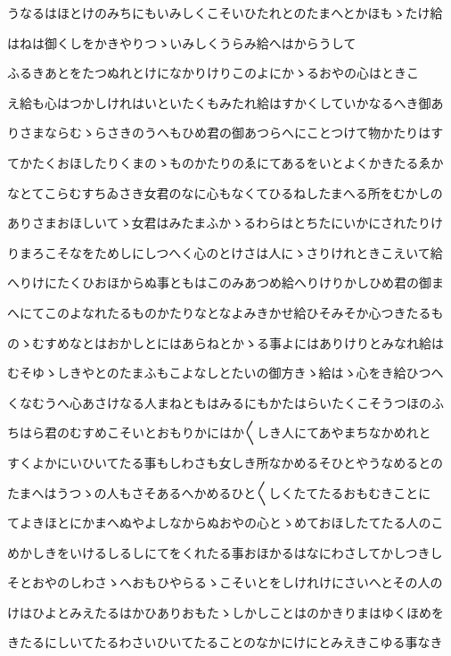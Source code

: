 \documentclass[a4paper,11pt,landscape]{ltjtarticle}
\begin{document}
うなるはほとけのみちにもいみしくこそいひたれとのたまへとかほもゝたけ給
\par\medskip
はねは御くしをかきやりつゝいみしくうらみ給へはからうして
\par\medskip
ふるきあとをたつぬれとけになかりけりこのよにかゝるおやの心はときこ
\par\medskip
え給も心はつかしけれはいといたくもみたれ給はすかくしていかなるへき御あ
\par\medskip
りさまならむゝらさきのうへもひめ君の御あつらへにことつけて物かたりはす
\par\medskip
てかたくおほしたりくまのゝものかたりのゑにてあるをいとよくかきたるゑか
\par\medskip
なとてこらむすちゐさき女君のなに心もなくてひるねしたまへる所をむかしの
\par\medskip
ありさまおほしいてゝ女君はみたまふかゝるわらはとちたにいかにされたりけ
\par\medskip
りまろこそなをためしにしつへく心のとけさは人にゝさりけれときこえいて給
\par\medskip
へりけにたくひおほからぬ事ともはこのみあつめ給へりけりかしひめ君の御ま
\par\medskip
へにてこのよなれたるものかたりなとなよみきかせ給ひそみそか心つきたるも
\par\medskip
のゝむすめなとはおかしとにはあらねとかゝる事よにはありけりとみなれ給は
\par\medskip
むそゆゝしきやとのたまふもこよなしとたいの御方きゝ給はゝ心をき給ひつへ
\par\medskip
くなむうへ心あさけなる人まねともはみるにもかたはらいたくこそうつほのふ
\par\medskip
ちはら君のむすめこそいとおもりかにはか〱しき人にてあやまちなかめれと
\par\medskip
すくよかにいひいてたる事もしわさも女しき所なかめるそひとやうなめるとの
\par\medskip
たまへはうつゝの人もさそあるへかめるひと〱しくたてたるおもむきことに
\par\medskip
てよきほとにかまへぬやよしなからぬおやの心とゝめておほしたてたる人のこ
\par\medskip
めかしきをいけるしるしにてをくれたる事おほかるはなにわさしてかしつきし
\par\medskip
そとおやのしわさゝへおもひやらるゝこそいとをしけれけにさいへとその人の
\par\medskip
けはひよとみえたるはかひありおもたゝしかしことはのかきりまはゆくほめを
\par\medskip
きたるにしいてたるわさいひいてたることのなかにけにとみえきこゆる事なき
\end{document}
